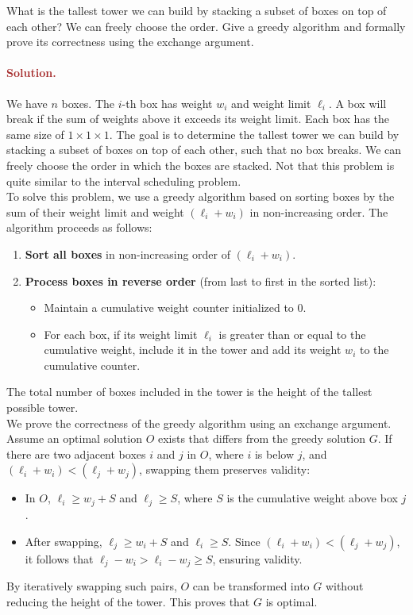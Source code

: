What is the tallest tower we can build by stacking a subset of boxes on top of each other? We can freely choose the order. Give a greedy algorithm and formally prove its correctness using the exchange argument.

\paragraph{\textcolor{brown}{Solution.}}
We have $n$ boxes. The $i$-th box has weight $w_i$ and weight limit $\ell_i$. A box will break if the sum of weights above it exceeds its weight limit. Each box has the same size of $1 \times 1 \times 1$. The goal is to determine the tallest tower we can build by stacking a subset of boxes on top of each other, such that no box breaks. We can freely choose the order in which the boxes are stacked. Not that this problem is quite similar to the interval scheduling problem.\\
To solve this problem, we use a greedy algorithm based on sorting boxes by the sum of their weight limit and weight $(\ell_i + w_i)$ in non-increasing order. The algorithm proceeds as follows: \begin{enumerate} \item \textbf{Sort all boxes} in non-increasing order of $(\ell_i + w_i)$. \item \textbf{Process boxes in reverse order} (from last to first in the sorted list): \begin{itemize} \item Maintain a cumulative weight counter initialized to $0$. \item For each box, if its weight limit $\ell_i$ is greater than or equal to the cumulative weight, include it in the tower and add its weight $w_i$ to the cumulative counter. \end{itemize} \end{enumerate} The total number of boxes included in the tower is the height of the tallest possible tower. \\
We prove the correctness of the greedy algorithm using an exchange argument. Assume an optimal solution $O$ exists that differs from the greedy solution $G$. If there are two adjacent boxes $i$ and $j$ in $O$, where $i$ is below $j$, and $(\ell_i + w_i) < (\ell_j + w_j)$, swapping them preserves validity: \begin{itemize} \item In $O$, $\ell_i \geq w_j + S$ and $\ell_j \geq S$, where $S$ is the cumulative weight above box $j$. \item After swapping, $\ell_j \geq w_i + S$ and $\ell_i \geq S$. Since $(\ell_i + w_i) < (\ell_j + w_j)$, it follows that $\ell_j - w_i > \ell_i - w_j \geq S$, ensuring validity. \end{itemize} By iteratively swapping such pairs, $O$ can be transformed into $G$ without reducing the height of the tower. This proves that $G$ is optimal.



